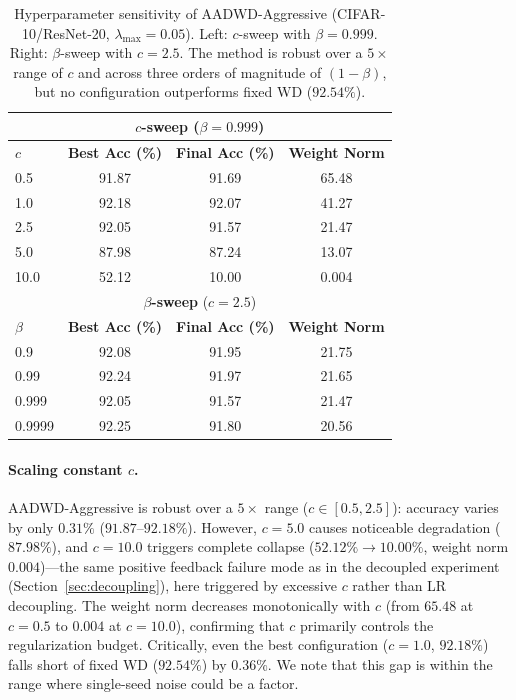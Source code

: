 \documentclass{article}
\begin{document}
\begin{table}[t]
  \centering
  \caption{Hyperparameter sensitivity of AADWD-Aggressive
           (CIFAR-10/ResNet-20, $\lambda_{\max} = 0.05$).
           Left: $c$-sweep with $\beta = 0.999$.
           Right: $\beta$-sweep with $c = 2.5$.
           The method is robust over a $5\times$ range of $c$ and across three orders
           of magnitude of $(1-\beta)$, but no configuration outperforms fixed WD
           ($92.54\%$).}
  \label{tab:sensitivity}
  \small
  \begin{tabular}{lccc}
    \toprule
    \multicolumn{4}{c}{\textbf{$c$-sweep} ($\beta = 0.999$)} \\
    \midrule
    $c$ & \textbf{Best Acc (\%)} & \textbf{Final Acc (\%)} & \textbf{Weight Norm} \\
    \midrule
    0.5  & 91.87 & 91.69 & 65.48 \\
    1.0  & 92.18 & 92.07 & 41.27 \\
    2.5  & 92.05 & 91.57 & 21.47 \\
    5.0  & 87.98 & 87.24 & 13.07 \\
    10.0 & 52.12 & 10.00 & 0.004 \\
    \midrule
    \multicolumn{4}{c}{\textbf{$\beta$-sweep} ($c = 2.5$)} \\
    \midrule
    $\beta$ & \textbf{Best Acc (\%)} & \textbf{Final Acc (\%)} & \textbf{Weight Norm} \\
    \midrule
    0.9    & 92.08 & 91.95 & 21.75 \\
    0.99   & 92.24 & 91.97 & 21.65 \\
    0.999  & 92.05 & 91.57 & 21.47 \\
    0.9999 & 92.25 & 91.80 & 20.56 \\
    \bottomrule
  \end{tabular}
\end{table}

\paragraph{Scaling constant $c$.}
AADWD-Aggressive is robust over a $5\times$ range ($c \in [0.5, 2.5]$): accuracy
varies by only $0.31\%$ ($91.87$--$92.18\%$).
However, $c = 5.0$ causes noticeable degradation ($87.98\%$), and $c = 10.0$
triggers complete collapse ($52.12\% \to 10.00\%$, weight norm $0.004$)---the same
positive feedback failure mode as in the decoupled experiment
(Section~\ref{sec:decoupling}), here triggered by excessive $c$ rather than LR
decoupling.
The weight norm decreases monotonically with $c$ (from $65.48$ at $c = 0.5$ to
$0.004$ at $c = 10.0$), confirming that $c$ primarily controls the regularization
budget.
Critically, even the best configuration ($c = 1.0$, $92.18\%$) falls short of fixed
WD ($92.54\%$) by $0.36\%$.
We note that this gap is within the range where single-seed noise could be a factor.
\end{document}
